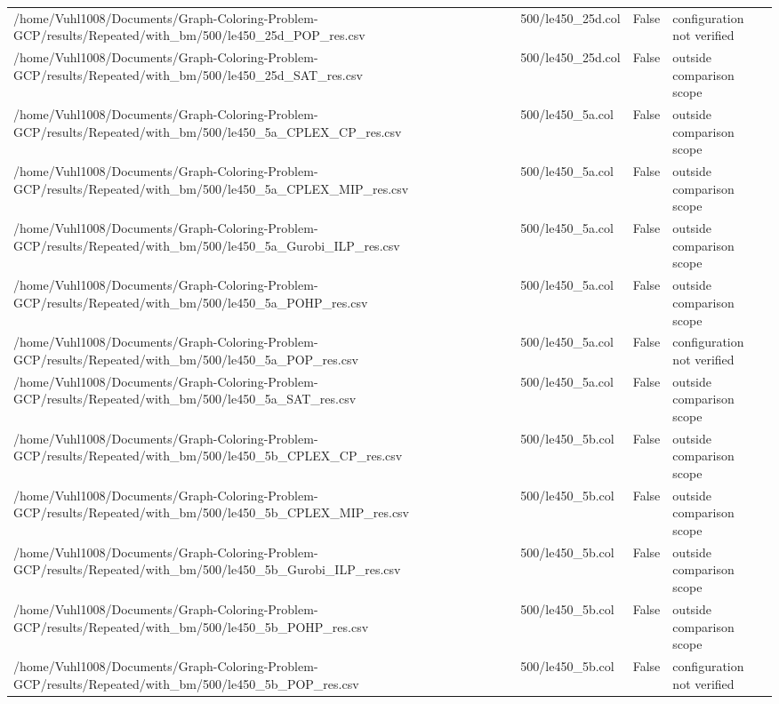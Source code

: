 \begin{table}[htbp]
\begin{tabular}{llll}
/home/Vuhl1008/Documents/Graph-Coloring-Problem-GCP/results/Repeated/with\_bm/500/le450\_25d\_POP\_res.csv & 500/le450\_25d.col & False & configuration not verified \\
/home/Vuhl1008/Documents/Graph-Coloring-Problem-GCP/results/Repeated/with\_bm/500/le450\_25d\_SAT\_res.csv & 500/le450\_25d.col & False & outside comparison scope \\
/home/Vuhl1008/Documents/Graph-Coloring-Problem-GCP/results/Repeated/with\_bm/500/le450\_5a\_CPLEX\_CP\_res.csv & 500/le450\_5a.col & False & outside comparison scope \\
/home/Vuhl1008/Documents/Graph-Coloring-Problem-GCP/results/Repeated/with\_bm/500/le450\_5a\_CPLEX\_MIP\_res.csv & 500/le450\_5a.col & False & outside comparison scope \\
/home/Vuhl1008/Documents/Graph-Coloring-Problem-GCP/results/Repeated/with\_bm/500/le450\_5a\_Gurobi\_ILP\_res.csv & 500/le450\_5a.col & False & outside comparison scope \\
/home/Vuhl1008/Documents/Graph-Coloring-Problem-GCP/results/Repeated/with\_bm/500/le450\_5a\_POHP\_res.csv & 500/le450\_5a.col & False & outside comparison scope \\
/home/Vuhl1008/Documents/Graph-Coloring-Problem-GCP/results/Repeated/with\_bm/500/le450\_5a\_POP\_res.csv & 500/le450\_5a.col & False & configuration not verified \\
/home/Vuhl1008/Documents/Graph-Coloring-Problem-GCP/results/Repeated/with\_bm/500/le450\_5a\_SAT\_res.csv & 500/le450\_5a.col & False & outside comparison scope \\
/home/Vuhl1008/Documents/Graph-Coloring-Problem-GCP/results/Repeated/with\_bm/500/le450\_5b\_CPLEX\_CP\_res.csv & 500/le450\_5b.col & False & outside comparison scope \\
/home/Vuhl1008/Documents/Graph-Coloring-Problem-GCP/results/Repeated/with\_bm/500/le450\_5b\_CPLEX\_MIP\_res.csv & 500/le450\_5b.col & False & outside comparison scope \\
/home/Vuhl1008/Documents/Graph-Coloring-Problem-GCP/results/Repeated/with\_bm/500/le450\_5b\_Gurobi\_ILP\_res.csv & 500/le450\_5b.col & False & outside comparison scope \\
/home/Vuhl1008/Documents/Graph-Coloring-Problem-GCP/results/Repeated/with\_bm/500/le450\_5b\_POHP\_res.csv & 500/le450\_5b.col & False & outside comparison scope \\
/home/Vuhl1008/Documents/Graph-Coloring-Problem-GCP/results/Repeated/with\_bm/500/le450\_5b\_POP\_res.csv & 500/le450\_5b.col & False & configuration not verified \\

\end{tabular}
\end{table}
